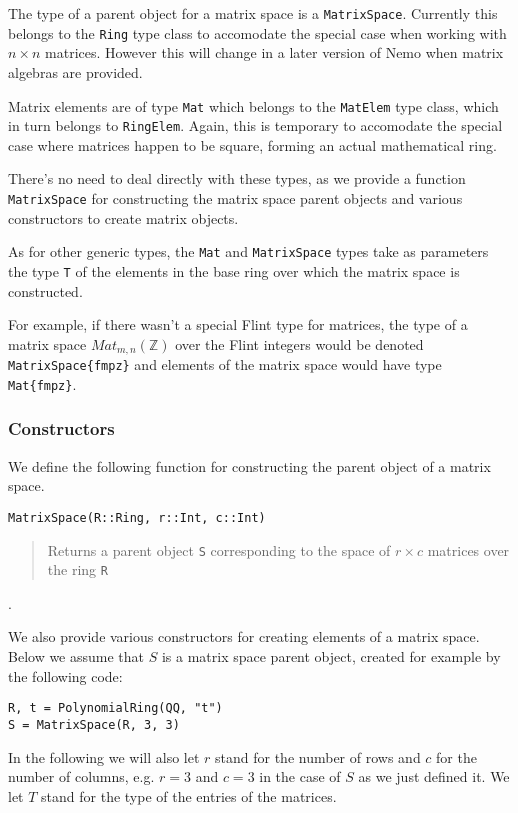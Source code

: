 \documentclass[a4paper,10pt]{article}
\newcommand{\Z}{\mathbb{Z}}
\newcommand{\code}{\lstinline}
\newcommand{\desc}[1]{\vspace{-3mm}\begin{quote}#1\end{quote}}
\begin{document}
The type of a parent object for a matrix space is a \code{MatrixSpace}. Currently
this belongs to the \code{Ring} type class to accomodate the special case when
working with $n\times n$ matrices. However this will change in a later version
of Nemo when matrix algebras are provided.

Matrix elements are of type \code{Mat} which belongs to the \code{MatElem} type
class, which in turn belongs to \code{RingElem}. Again, this is temporary to
accomodate the special case where matrices happen to be square, forming an actual
mathematical ring.

There's no need to deal directly with these types, as we provide a function
\code{MatrixSpace} for constructing the matrix space parent objects and various
constructors to create matrix objects.

As for other generic types, the \code{Mat} and \code{MatrixSpace}
types take as parameters the type \code{T} of the elements in the base ring
over which the matrix space is constructed.

For example, if there wasn't a special Flint type for matrices, the type of
a matrix space $Mat_{m, n}(\Z)$ over the Flint integers would be denoted
\code|MatrixSpace{fmpz}| and elements of the matrix space would have type
\code|Mat{fmpz}|.

\subsubsection{Constructors}

We define the following function for constructing the parent object of a
matrix space.

\begin{lstlisting}
MatrixSpace(R::Ring, r::Int, c::Int)
\end{lstlisting}

\desc{Returns a parent object \code{S} corresponding to the space of $r\times c$
matrices over the ring \code{R}}.

We also provide various constructors for creating elements of a matrix space. Below
we assume that $S$ is a matrix space parent object, created for example by the
following code:

\begin{lstlisting}
R, t = PolynomialRing(QQ, "t")
S = MatrixSpace(R, 3, 3)
\end{lstlisting}

In the following we will also let $r$ stand for the number of rows and $c$ for the
number of columns, e.g. $r = 3$ and $c = 3$ in the case of $S$ as we just defined it.
We let $T$ stand for the type of the entries of the matrices.
\end{document}
